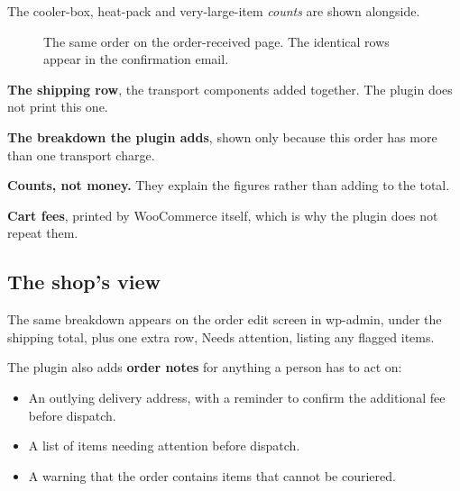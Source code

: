 \documentclass[11pt,a4paper,oneside]{report}
\begin{document}
The cooler-box, heat-pack and very-large-item \emph{counts} are shown alongside.

\begin{figure}[H]
\centering
{}
\caption{The same order on the order-received page. The identical rows appear
in the confirmation email.}
\label{fig:order-breakdown}
\end{figure}

\vspace{-8pt}
\begin{description}[leftmargin=1.6em,labelindent=0pt,itemsep=2pt,parsep=0pt,
                    topsep=2pt,font=\normalfont]
  \item {} \textbf{The shipping row}, the transport components added
    together. The plugin does not print this one.
  \item {} \textbf{The breakdown the plugin adds}, shown only because
    this order has more than one transport charge.
  \item {} \textbf{Counts, not money.} They explain the figures rather
    than adding to the total.
  \item {} \textbf{Cart fees}, printed by WooCommerce itself, which is
    why the plugin does not repeat them.
\end{description}

\subsection{The shop's view}

The same breakdown appears on the order edit screen in wp-admin, under the shipping
total, plus one extra row, \textsf{Needs attention}, listing any flagged items.

The plugin also adds \textbf{order notes} for anything a person has to act on:

\begin{itemize}
  \item An outlying delivery address, with a reminder to confirm the additional fee
        before dispatch.
  \item A list of items needing attention before dispatch.
  \item A warning that the order contains items that cannot be couriered.
\end{itemize}
\end{document}
